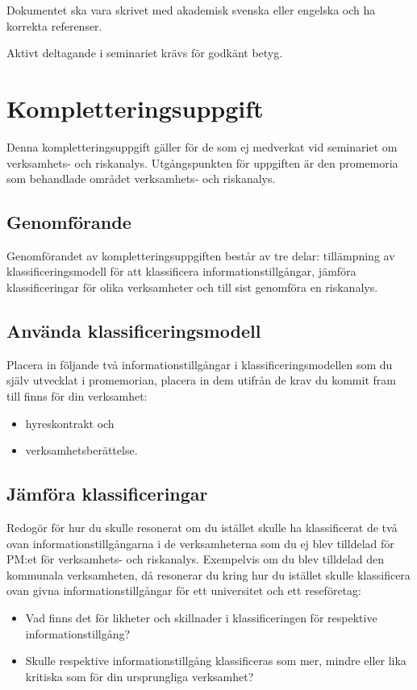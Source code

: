 \documentclass[a4paper]{llncs}
\begin{document}
Dokumentet ska vara skrivet med akademisk svenska eller engelska och ha 
korrekta referenser.

Aktivt deltagande i seminariet krävs för godkänt betyg.


\printbibliography{}


\appendix
\section{Kompletteringsuppgift}

Denna kompletteringsuppgift gäller för de som ej medverkat vid seminariet om
verksamhets- och riskanalys.
Utgångspunkten för uppgiften är den promemoria som behandlade området
verksamhets- och riskanalys.

\subsection{Genomförande}

Genomförandet av kompletteringsuppgiften består av tre delar: tillämpning av 
klassificeringsmodell för att klassificera informationstillgångar, jämföra 
klassificeringar för olika verksamheter och till sist genomföra en riskanalys.

\subsection{Använda klassificeringsmodell}
\label{sec:use}

Placera in följande två informationstillgångar i klassificeringsmodellen som du 
själv utvecklat i promemorian, placera in dem utifrån de krav du kommit fram 
till finns för din verksamhet:
\begin{itemize}
  \item hyreskontrakt och
  \item verksamhetsberättelse.
\end{itemize}

\subsection{Jämföra klassificeringar}
\label{sec:compare}

Redogör för hur du skulle resonerat om du istället skulle ha klassificerat de 
två ovan informationstillgångarna i de verksamheterna som du ej blev tilldelad 
för PM:et för verksamhets- och riskanalys.
Exempelvis om du blev tilldelad den kommunala verksamheten, då resonerar du 
kring hur du istället skulle klassificera ovan givna informationstillgångar för 
ett universitet och ett reseföretag:
\begin{itemize}
  \item Vad finns det för likheter och skillnader i klassificeringen för 
    respektive informationstillgång?
  \item Skulle respektive informationstillgång klassificeras som mer, mindre 
    eller lika kritiska som för din ursprungliga verksamhet?
\end{itemize}
\end{document}
